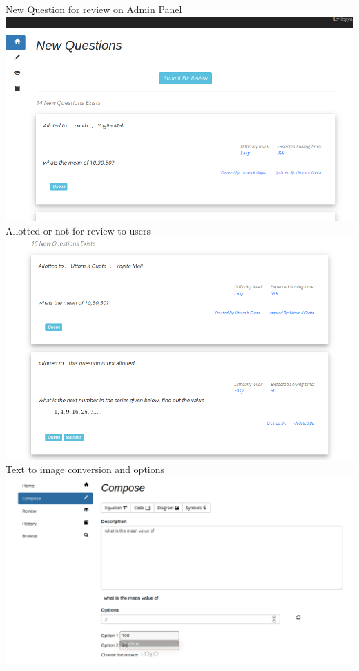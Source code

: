 \documentclass[a4paper,12pt,oneside]{book}
\begin{document}
\vspace{0.7in}
New Question for review on Admin Panel \\
\includegraphics[scale=0.35]{newquestions.png}	\\

\vspace{2in}
Allotted or not for review to users \\
\includegraphics[scale=0.45]{allotedreview.png}	\\

\vspace{1in}
Text to image conversion and options\\
\includegraphics[scale=0.3]{compose.png}	\\
\end{document}
